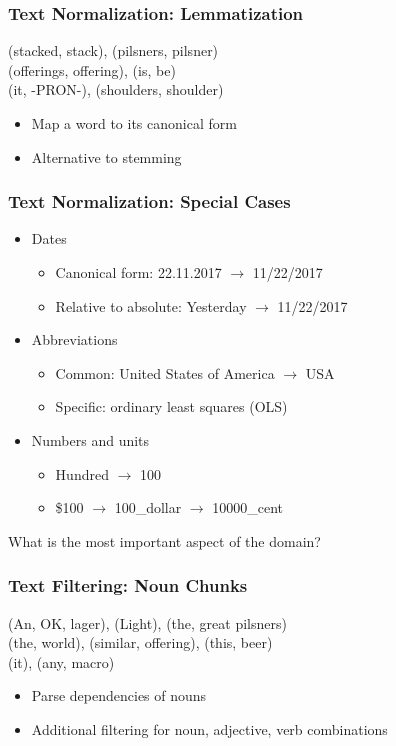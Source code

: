 \begin{frame}
    \frametitle{Text Normalization: Lemmatization}
\begin{spacing}{1.6}
    (stacked, stack), (pilsners, pilsner) \\
    (offerings, offering), (is, be) \\
    (it, -PRON-), (shoulders, shoulder)
\end{spacing}
\vspace{10pt}
\begin{itemize}
\item Map a word to its canonical form
\item Alternative to stemming
\end{itemize}
\end{frame}

\begin{frame}
    \frametitle{Text Normalization: Special Cases}
\begin{itemize}
\item Dates
\begin{itemize}
\item Canonical form: 22.11.2017 $\rightarrow$ 11/22/2017
\item Relative to absolute: Yesterday $\rightarrow$ 11/22/2017
\end{itemize}
\item Abbreviations
\begin{itemize}
\item Common: United States of America $\rightarrow$ USA
\item Specific: ordinary least squares (OLS)
\end{itemize}
\item Numbers and units
\begin{itemize}
\item Hundred $\rightarrow$ 100
\item \$100 $\rightarrow$ 100\_dollar $\rightarrow$ 10000\_cent
\end{itemize}
\end{itemize}

\vspace{10pt}
What is the most important aspect of the domain?
\end{frame}

\begin{frame}
    \frametitle{Text Filtering: Noun Chunks}
\begin{spacing}{1.6}
    (An, OK, lager), (Light), (the, great pilsners) \\
    (the, world), (similar, offering), (this, beer) \\
    (it), (any, macro)
\end{spacing}
\vspace{10pt}
\begin{itemize}
\item Parse dependencies of nouns
\item Additional filtering for noun, adjective, verb combinations
\end{itemize}
\end{frame}